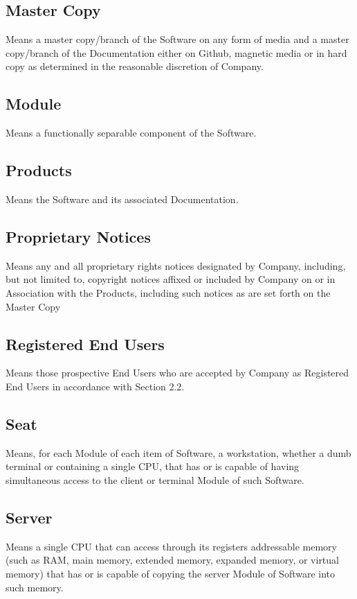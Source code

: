 \documentclass[letterpaper,10pt,english]{sphinxmanual}
\begin{document}
\subsection{Master Copy}
\label{\detokenize{definitions:master-copy}}
Means a master copy/branch of the Software on any form of media and a master copy/branch of the Documentation either on Github, magnetic media or in hard copy as determined in the reasonable discretion of Company.


\subsection{Module}
\label{\detokenize{definitions:module}}
Means a functionally separable component of the Software.


\subsection{Products}
\label{\detokenize{definitions:products}}
Means the Software and its associated Documentation.


\subsection{Proprietary Notices}
\label{\detokenize{definitions:proprietary-notices}}
Means any and all proprietary rights notices designated by Company, including, but not limited to, copyright notices affixed or included by Company on or in Association  with the Products, including such notices as are set forth on the Master Copy


\subsection{Registered End Users}
\label{\detokenize{definitions:registered-end-users}}
Means those prospective End Users who are accepted by Company as Registered End Users in accordance with Section 2.2.


\subsection{Seat}
\label{\detokenize{definitions:seat}}
Means, for each Module of each item of Software, a workstation, whether a dumb terminal or containing a single CPU, that has or is capable of having simultaneous access to the client or terminal Module of such Software.


\subsection{Server}
\label{\detokenize{definitions:server}}
Means a single CPU that can access through its registers addressable memory (such as RAM, main memory, extended memory, expanded memory, or virtual memory) that has or is capable of copying the server Module of Software into such memory.
\end{document}

